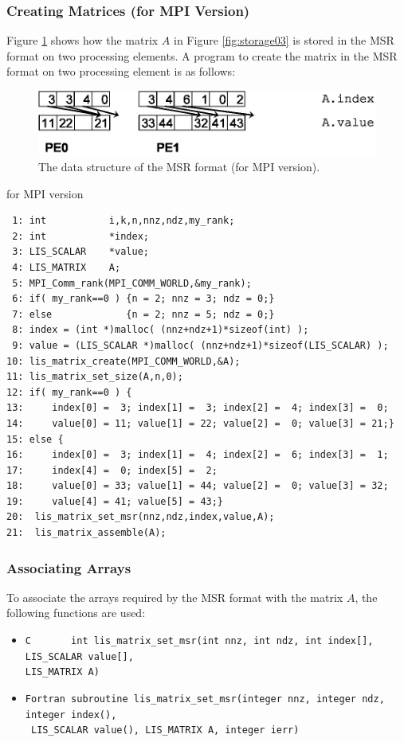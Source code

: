 \documentclass[a4paper]{article}
\begin{document}
\subsubsection{Creating Matrices (for MPI Version)}
Figure \ref{fig:storage03_mpi} shows how the matrix $A$ in Figure
\ref{fig:storage03} is stored in the MSR format on two processing 
elements. A program to create the matrix in the MSR format on two processing element is as follows:
\begin{figure}[h]
{\centering 
\includegraphics{storage03_mpi.eps} 
\caption{The data structure of the MSR format (for MPI version).}\label{fig:storage03_mpi}}
\end{figure}
\begin{itembox}[l]{for MPI version}
\small
\begin{verbatim}
 1: int           i,k,n,nnz,ndz,my_rank;
 2: int           *index;
 3: LIS_SCALAR    *value;
 4: LIS_MATRIX    A;
 5: MPI_Comm_rank(MPI_COMM_WORLD,&my_rank);
 6: if( my_rank==0 ) {n = 2; nnz = 3; ndz = 0;}
 7: else             {n = 2; nnz = 5; ndz = 0;}
 8: index = (int *)malloc( (nnz+ndz+1)*sizeof(int) );
 9: value = (LIS_SCALAR *)malloc( (nnz+ndz+1)*sizeof(LIS_SCALAR) );
10: lis_matrix_create(MPI_COMM_WORLD,&A);
11: lis_matrix_set_size(A,n,0);
12: if( my_rank==0 ) {
13:     index[0] =  3; index[1] =  3; index[2] =  4; index[3] =  0;
14:     value[0] = 11; value[1] = 22; value[2] =  0; value[3] = 21;}
15: else {
16:     index[0] =  3; index[1] =  4; index[2] =  6; index[3] =  1;
17:     index[4] =  0; index[5] =  2;
18:     value[0] = 33; value[1] = 44; value[2] =  0; value[3] = 32;
19:     value[4] = 41; value[5] = 43;}
20:  lis_matrix_set_msr(nnz,ndz,index,value,A);
21:  lis_matrix_assemble(A);
\end{verbatim}
\end{itembox}
\subsubsection{Associating Arrays}
To associate the arrays required by the MSR format with the matrix $A$, the following functions are used:
\begin{itemize}
\item \verb|C       int lis_matrix_set_msr(int nnz, int ndz, int index[], LIS_SCALAR value[], |\\
      \verb|LIS_MATRIX A)|
\item \verb|Fortran subroutine lis_matrix_set_msr(integer nnz, integer ndz, integer index(),|\\
      \verb| LIS_SCALAR value(), LIS_MATRIX A, integer ierr)|
\end{itemize}
\end{document}
